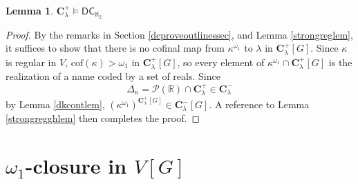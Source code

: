 \documentclass[12pt]{article}
\newtheorem{lemma}[theorem]{Lemma}
\def\bbC{{\mathbf{C}}}
\renewcommand{\models}{\vDash}
\newcommand{\powerset}{\mathcal{P}}
\newcommand{\bbR}{\mathbb{R}}
\newcommand{\DC}{\mathsf{DC}}
\newcommand{\cP}{\mathcal{P}}
\newcommand{\cof}{\mathrm{cof}}
\newcommand{\restrict}{\mathord{\upharpoonright}}
\begin{document}
\begin{lemma}\label{cpgdc2lem} $\bbC^{+}_{\lambda} \models \DC_{\aleph_{2}}$
\end{lemma}

\begin{proof} By the remarks in Section \ref{dcproveoutlinessec}, and Lemma \ref{strongreglem}, it suffices to show that there is no cofinal map
from $\kappa^{\omega_{1}}$ to $\lambda$ in $\bbC^{+}_{\lambda}[G]$. Since $\kappa$ is regular in $V$, $\cof(\kappa) > \omega_{1}$ in $\bbC^{+}_{\lambda}[G]$, so every element of $\kappa^{\omega_{1}} \cap \bbC^{+}_{\lambda}[G]$ is the realization of a name coded by a set of reals.
Since \[\Delta_{\kappa} = \cP(\bbR) \cap \bbC^{+}_{\lambda} \in \bbC^{-}_{\lambda}\] by Lemma \ref{dkcontlem}, $(\kappa^{\omega_{1}})^{\bbC^{+}_{\lambda}[G]} \in \bbC^{-}_{\lambda}[G]$. A reference to Lemma \ref{strongregghlem} then completes the proof.
\end{proof}













\section{$\omega_{1}$-closure in $V[G]$}
\end{document}
